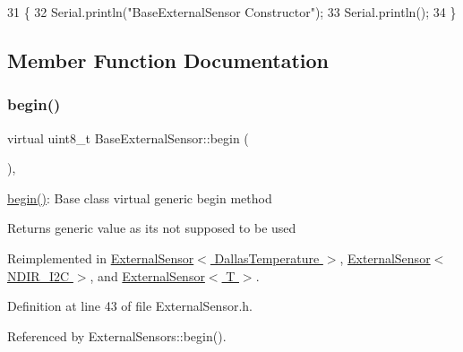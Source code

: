 \begin{DoxyCode}
31     \{
32         Serial.println(\textcolor{stringliteral}{"BaseExternalSensor Constructor"});
33         Serial.println();
34     \}
\end{DoxyCode}


\subsection{Member Function Documentation}
\mbox{\label{classBaseExternalSensor_a87d132803d4f4fdd4e66332809f0c9a0}} 
\subsubsection{\texorpdfstring{begin()}{begin()}}
{\footnotesize\ttfamily virtual uint8\+\_\+t Base\+External\+Sensor\+::begin (\begin{DoxyParamCaption}{ }\end{DoxyParamCaption})\hspace{0.3cm}{\ttfamily [inline]}, {\ttfamily [virtual]}}

\hyperlink{classBaseExternalSensor_a87d132803d4f4fdd4e66332809f0c9a0}{begin()}\+: Base class virtual generic begin method

\begin{DoxyReturn}{Returns}
generic value as it\textquotesingle{}s not supposed to be used 
\end{DoxyReturn}


Reimplemented in \hyperlink{classExternalSensor_3_01DallasTemperature_01_4_ac5275129b05e2ff8df45d5b222a661d9}{External\+Sensor$<$ Dallas\+Temperature $>$}, \hyperlink{classExternalSensor_3_01NDIR__I2C_01_4_ac6f3614d94968ef0cc11b2b4d69cef03}{External\+Sensor$<$ N\+D\+I\+R\+\_\+\+I2\+C $>$}, and \hyperlink{classExternalSensor_ab6fe1379d55b656a048e0fba1e0a32e6}{External\+Sensor$<$ T $>$}.



Definition at line 43 of file External\+Sensor.\+h.



Referenced by External\+Sensors\+::begin().


